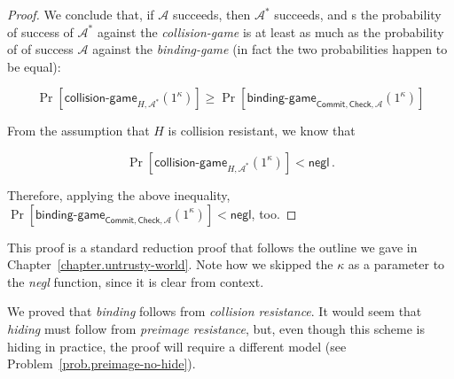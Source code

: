 \begin{proof}
  We conclude that, if $\mathcal{A}$ succeeds, then $\mathcal{A}^*$ succeeds, and s
  the probability of success of $\mathcal{A}^*$ against the \emph{collision-game}
  is at least as much as the probability of of success $\mathcal{A}$ against the \emph{binding-game}
  (in fact the two probabilities happen to be equal):

  \[
    \Pr[\textsf{collision-game}_{H,\mathcal{A}^*}(1^\kappa)] \geq
    \Pr[\textsf{binding-game}_{\textsf{Commit},\textsf{Check},\mathcal{A}}(1^\kappa)]
  \]

  From the assumption that $H$ is collision resistant, we know that

  \[
    \Pr[\textsf{collision-game}_{H,\mathcal{A}^*}(1^\kappa)] < \textsf{negl}\,.
  \]

  Therefore, applying the above inequality,
  $\Pr[\textsf{binding-game}_{\textsf{Commit},\textsf{Check},\mathcal{A}}(1^\kappa)] < \textsf{negl}$,
  too.
\end{proof}

This proof is a standard reduction proof that follows the outline we gave in Chapter~\ref{chapter.untrusty-world}.
Note how we skipped the $\kappa$ as a parameter to the \emph{negl} function, since it is clear
from context.

We proved that \emph{binding} follows from \emph{collision resistance}. It would seem that
\emph{hiding} must follow from \emph{preimage resistance}, but, even though this scheme is
hiding in practice, the proof will require a different model (see Problem~\ref{prob.preimage-no-hide}).
